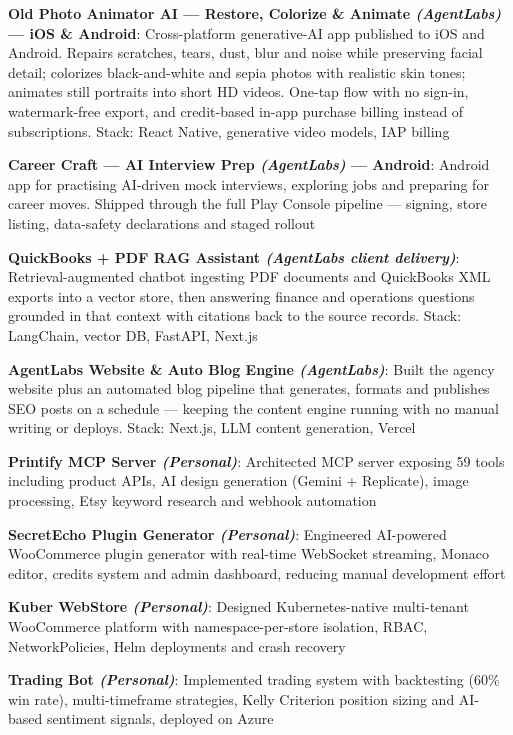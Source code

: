 \documentclass[a4paper,20pt]{article}
\newcommand{\resumeItem}[2]{
  \item\small{
    \textbf{#1}{: #2 \vspace{-2pt}}
  }
}
\newcommand{\resumeSubItem}[2]{\resumeItem{#1}{#2}\vspace{-3pt}}
\begin{document}
\resumeSubItem{Old Photo Animator AI --- Restore, Colorize \& Animate \textit{(AgentLabs)} --- iOS \& Android}
  {Cross-platform generative-AI app published to iOS and Android. Repairs scratches, tears, dust, blur and noise while preserving facial detail; colorizes black-and-white and sepia photos with realistic skin tones; animates still portraits into short HD videos. One-tap flow with no sign-in, watermark-free export, and credit-based in-app purchase billing instead of subscriptions. Stack: React Native, generative video models, IAP billing}

\resumeSubItem{Career Craft --- AI Interview Prep \textit{(AgentLabs)} --- Android}
  {Android app for practising AI-driven mock interviews, exploring jobs and preparing for career moves. Shipped through the full Play Console pipeline --- signing, store listing, data-safety declarations and staged rollout}

\resumeSubItem{QuickBooks + PDF RAG Assistant \textit{(AgentLabs client delivery)}}
  {Retrieval-augmented chatbot ingesting PDF documents and QuickBooks XML exports into a vector store, then answering finance and operations questions grounded in that context with citations back to the source records. Stack: LangChain, vector DB, FastAPI, Next.js}

\resumeSubItem{AgentLabs Website \& Auto Blog Engine \textit{(AgentLabs)}}
  {Built the agency website plus an automated blog pipeline that generates, formats and publishes SEO posts on a schedule --- keeping the content engine running with no manual writing or deploys. Stack: Next.js, LLM content generation, Vercel}

\resumeSubItem{Printify MCP Server \textit{(Personal)}}
  {Architected MCP server exposing 59 tools including product APIs, AI design generation (Gemini + Replicate), image processing, Etsy keyword research and webhook automation}

\resumeSubItem{SecretEcho Plugin Generator \textit{(Personal)}}
  {Engineered AI-powered WooCommerce plugin generator with real-time WebSocket streaming, Monaco editor, credits system and admin dashboard, reducing manual development effort}

\resumeSubItem{Kuber WebStore \textit{(Personal)}}
  {Designed Kubernetes-native multi-tenant WooCommerce platform with namespace-per-store isolation, RBAC, NetworkPolicies, Helm deployments and crash recovery}

\resumeSubItem{Trading Bot \textit{(Personal)}}
  {Implemented trading system with backtesting (60\% win rate), multi-timeframe strategies, Kelly Criterion position sizing and AI-based sentiment signals, deployed on Azure}
\end{document}
